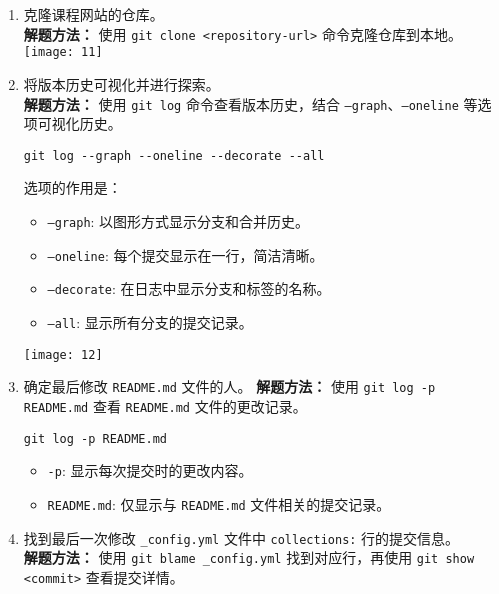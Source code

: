 \documentclass[12pt]{article}
\begin{document}
\begin{enumerate}
    \item 克隆课程网站的仓库。\\
    \textbf{解题方法：} 使用 \texttt{git clone <repository-url>} 命令克隆仓库到本地。\\
    \texttt{[image: 11]}

    \item 将版本历史可视化并进行探索。\\
    \textbf{解题方法：} 使用 \texttt{git log} 命令查看版本历史，结合 \texttt{--graph}、\texttt{--oneline} 等选项可视化历史。
    \begin{verbatim}
git log --graph --oneline --decorate --all
\end{verbatim}

选项的作用是：
   \begin{itemize}
    \item \texttt{--graph}: 以图形方式显示分支和合并历史。
    \item \texttt{--oneline}: 每个提交显示在一行，简洁清晰。
    \item \texttt{--decorate}: 在日志中显示分支和标签的名称。
    \item \texttt{--all}: 显示所有分支的提交记录。
\end{itemize}
\texttt{[image: 12]}
    
    \item 确定最后修改 \texttt{README.md} 文件的人。
    \textbf{解题方法：} 使用 \texttt{git log -p README.md} 查看 \texttt{README.md} 文件的更改记录。\\
    \begin{verbatim}
git log -p README.md
\end{verbatim}
\begin{itemize}
    \item \texttt{-p}: 显示每次提交时的更改内容。
    \item \texttt{README.md}: 仅显示与 \texttt{README.md} 文件相关的提交记录。
\end{itemize}


    
    \item 找到最后一次修改 \texttt{\_config.yml} 文件中 \texttt{collections:} 行的提交信息。\\
    \textbf{解题方法：} 使用 \texttt{git blame \_config.yml} 找到对应行，再使用 \texttt{git show <commit>} 查看提交详情。\\



\end{enumerate}
\end{document}
